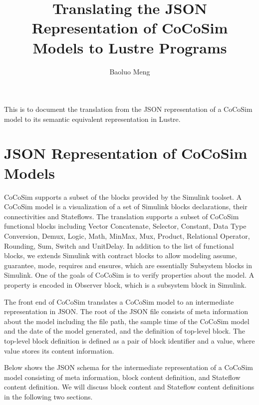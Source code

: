 \documentclass{article}
\begin{document}
\title{Translating the JSON Representation of CoCoSim Models to Lustre Programs}

\author{Baoluo Meng}


\maketitle

This is to document the translation from the JSON representation of a CoCoSim model to its semantic equivalent representation in Lustre.


\section{JSON Representation of CoCoSim Models}


CoCoSim supports a subset of the blocks provided by the Simulink toolset. 
A CoCoSim model is a visualization of a set of Simulink blocks declarations, their connectivities and Stateflows.
The translation supports a subset of CoCoSim functional blocks including Vector Concatenate, Selector, Constant, Data Type Conversion, Demux, Logic, Math, MinMax, Mux, Product, Relational Operator, Rounding, Sum, Switch and UnitDelay. 
In addition to the list of functional blocks, we extends Simulink with contract blocks to allow modeling \textsf{assume, guarantee, mode, requires} and \textsf{ensures}, which are essentially Subsystem blocks in Simulink. 
One of the goals of CoCoSim is to verify properties about the model. 
A property is encoded in \textsf{Observer} block, which is a subsystem block in Simulink. 

The front end of CoCoSim translates a CoCoSim model to an intermediate representation in JSON. 
The root of the JSON file consists of meta information about the model including the file path, the sample time of the CoCoSim model and the date of the model generated, and the definition of top-level block.
The top-level block definition is defined as a pair of block identifier and a value, where value stores its content information.


Below shows the JSON schema for the intermediate representation of a CoCoSim model consisting of meta information, block content definition, and Stateflow content definition.
We will discuss block content and Stateflow content definitions in the following two sections.
\end{document}
